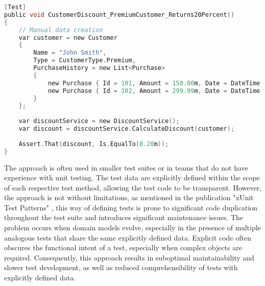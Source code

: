\begin{lstlisting}[language=C, caption=Explicit data creation example, label={lst:explicit}]
[Test]
public void CustomerDiscount_PremiumCustomer_Returns20Percent()
{
    // Manual data creation
    var customer = new Customer 
    { 
        Name = "John Smith", 
        Type = CustomerType.Premium,
        PurchaseHistory = new List<Purchase>
        {
            new Purchase { Id = 101, Amount = 150.00m, Date = DateTime.Now.AddDays(-5) },
            new Purchase { Id = 102, Amount = 299.99m, Date = DateTime.Now.AddDays(-2) }
        }
    };
    
    var discountService = new DiscountService();
    var discount = discountService.CalculateDiscount(customer);
    
    Assert.That(discount, Is.EqualTo(0.20m));
}
\end{lstlisting}

 The  approach is often used in smaller test suites or in teams that do not have experience with unit testing. The test data are explicitly defined within the scope of each respective test method, allowing the test code to be transparent. However, the approach is not without limitations, as mentioned in the publication "xUnit Test Patterns" \cite{Meszaros2007Jan}, this way of defining tests is prone to significant code duplication throughout the test suite and introduces significant maintenance issues. The problem occurs when domain models evolve, especially in the presence of multiple analogous tests that share the same explicitly defined data. Explicit code often obscures the functional intent of a test, especially when complex objects are required. Consequently, this approach results in suboptimal maintainability and slower test development, as well as reduced comprehensibility of tests with explicitly defined data.

